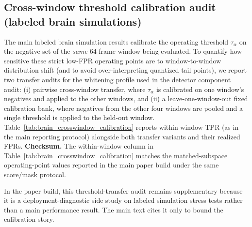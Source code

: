 \subsection{Cross-window threshold calibration audit (labeled brain simulations)}
\label{app:brain-crosswindow-calib}
\ifSUPPLEMENTONLY
The main labeled brain simulation results calibrate the operating threshold $\tau_\alpha$ on the negative set of the \emph{same} 64-frame window being evaluated. To quantify how sensitive these strict low-FPR operating points are to window-to-window distribution shift (and to avoid over-interpreting quantized tail points), we report two transfer audits for the whitening profile used in the detector component audit: (i) pairwise cross-window transfer, where $\tau_\alpha$ is calibrated on one window's negatives and applied to the other windows, and (ii) a leave-one-window-out fixed calibration bank, where negatives from the other four windows are pooled and a single threshold is applied to the held-out window. Table~\ref{tab:brain_crosswindow_calibration} reports within-window TPR (as in the main reporting protocol) alongside both transfer variants and their realized FPRs.
\noindent \textbf{Checksum.} The within-window column in Table~\ref{tab:brain_crosswindow_calibration} matches the matched-subspace operating-point values reported in the main paper build under the same score/mask protocol.

\begin{table}[t]
\centering
\small
\begingroup
\setlength{\tabcolsep}{4pt}
\endgroup
\caption{Labeled brain simulation threshold-transfer audit for the whitening profile used in the detector component audit. ``Within-window'' matches the main reporting protocol (calibrate $\tau_\alpha$ on a window's negatives and evaluate on that same window). ``Pairwise cross'' calibrates $\tau_\alpha$ on one window and evaluates on a disjoint window ($n=20$ ordered window pairs). ``Fixed-cal-set'' uses a leave-one-window-out calibration bank: for each held-out window, pool negatives from the other four windows, calibrate $\tau_\alpha$ once, and evaluate on the held-out window ($n=5$). Reported values are median (IQR) over windows/pairs.}
\label{tab:brain_crosswindow_calibration}
\end{table}
\else
\noindent In the paper build, this threshold-transfer audit remains supplementary because it is a deployment-diagnostic side study on labeled simulation stress tests rather than a main performance result. The main text cites it only to bound the calibration story.
\fi

